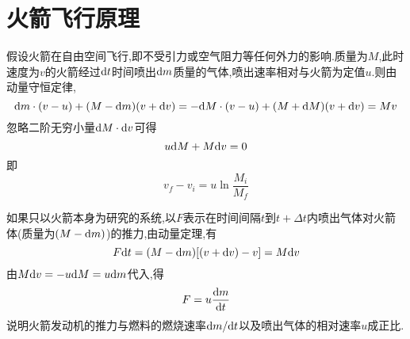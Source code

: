 \section{火箭飞行原理}
假设火箭在自由空间飞行,即不受引力或空气阻力等任何外力的影响.质量为$M$,此时速度为$v$的火箭经过${\rm{d}} t$时间喷出${\rm{d}} m$质量的气体,喷出速率相对与火箭为定值$u$.则由动量守恒定律,
\begin{equation*}
{\rm{d}} m\cdot (v-u)+(M-{\rm{d}} m)(v+{\rm{d}} v)=-{\rm{d}} M\cdot (v-u)+(M+{\rm{d}} M)(v+{\rm{d}} v)=Mv
\end{equation*}
忽略二阶无穷小量${\rm{d}} M \cdot {\rm{d}} v$可得
\begin{equation*}
u{\rm{d}} M+M{\rm{d}} v=0
\end{equation*}
即
\begin{equation*}
v_f-v_i=u\ln\frac{M_i}{M_f}
\end{equation*}
\par 如果只以火箭本身为研究的系统,以$F$表示在时间间隔$t$到$t+\Delta t$内喷出气体对火箭体(质量为$(M-{\rm{d}} m)$)的推力,由动量定理,有
\begin{equation*}
F{\rm{d}} t=(M-{\rm{d}} m)[(v+{\rm{d}} v)-v]=M{\rm{d}} v
\end{equation*}
由$M{\rm{d}} v=-u{\rm{d}} M=u {\rm{d}} m$代入,得
\begin{equation*}
F=u\frac{{\rm{d}} m}{{\rm{d}} t}
\end{equation*}
说明火箭发动机的推力与燃料的燃烧速率${\rm{d}} m/{\rm{d}} t $以及喷出气体的相对速率$u$成正比.

